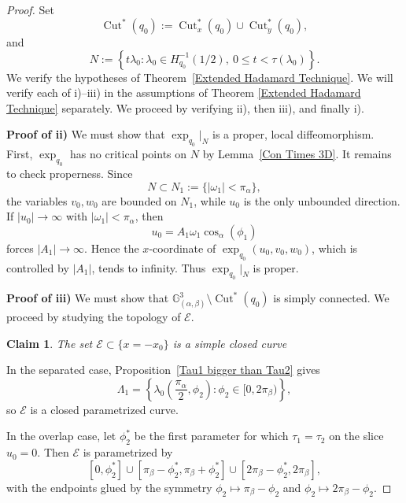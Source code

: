 \documentclass[12pt]{amsart}
\numberwithin{equation}{section}
\theoremstyle{plain}
\newtheorem{claim}[theorem]{Claim}%
\theoremstyle{definition}
\theoremstyle{remark}
\begin{document}
\begin{proof}
    Set
    \[
        \operatorname{Cut}^*(q_0)
        :=
        \operatorname{Cut}_x^*(q_0)
        \cup
        \operatorname{Cut}_y^*(q_0),
    \]
    and
    \[
        N
        :=
        \left\{
        t\lambda_0:
        \lambda_0\in H_{q_0}^{-1}(1/2),
        \ 0\leq t<\tau(\lambda_0)
        \right\}.
    \]
    We verify the hypotheses of Theorem~\ref{Extended Hadamard Technique}. We will verify each of i)–iii) in the assumptions of Theorem \ref{Extended Hadamard Technique} separately. We proceed by verifying ii), then iii), and finally i).\smallskip

    \textbf{Proof of ii)} We must show that $\exp_{q_0}\rvert_N$ is a proper, local diffeomorphism. First, \(\exp_{q_0}\) has no critical points on $N$ by
    Lemma~\ref{Con Times 3D}. It remains to check properness. Since
    \[
        N\subset N_1:=\{|\omega_1|<\pi_\alpha\},
    \]
    the variables \(v_0,w_0\) are bounded on \(N_1\), while \(u_0\) is the only unbounded
    direction. If \(|u_0|\to\infty\) with \(|\omega_1|<\pi_\alpha\), then
    \[
        u_0=A_1\omega_1\cos_\alpha(\phi_1)
    \]
    forces \(|A_1|\to\infty\). Hence the \(x\)-coordinate of
    \(\exp_{q_0}(u_0,v_0,w_0)\), which is controlled by $\lvert A_1\rvert$, tends to infinity. Thus
    \(\exp_{q_0}|_N\) is proper.

    \textbf{Proof of iii)} We must show that $\mathbb{G}^3_{(\alpha,\beta)}\setminus \operatorname{Cut}^*(q_0)$ is simply connected. We proceed by studying the topology of \(\mathcal E\).

    \begin{claim}\label{simply connected claim}
        The set \(\mathcal E\subset\{x=-x_0\}\) is a simple closed curve
    \end{claim}
    In the separated case, Proposition~\ref{Tau1 bigger than Tau2} gives
    \[
        \Lambda_1
        =
        \left\{
        \lambda_0\left(\frac{\pi_\alpha}{2},\phi_2\right):
        \phi_2\in[0,2\pi_\beta)
        \right\},
    \]
    so \(\mathcal E\) is a closed parametrized curve.

    In the overlap case, let \(\phi_2^*\) be the first parameter for which
    \(\tau_1=\tau_2\) on the slice \(u_0=0\). Then \(\mathcal E\) is parametrized by
    \[
        [0,\phi_2^*]
        \cup
        [\pi_\beta-\phi_2^*,\pi_\beta+\phi_2^*]
        \cup
        [2\pi_\beta-\phi_2^*,2\pi_\beta],
    \]
    with the endpoints glued by the symmetry
    \(\phi_2\mapsto\pi_\beta-\phi_2\) and
    \(\phi_2\mapsto2\pi_\beta-\phi_2\).


\end{proof}
\end{document}
